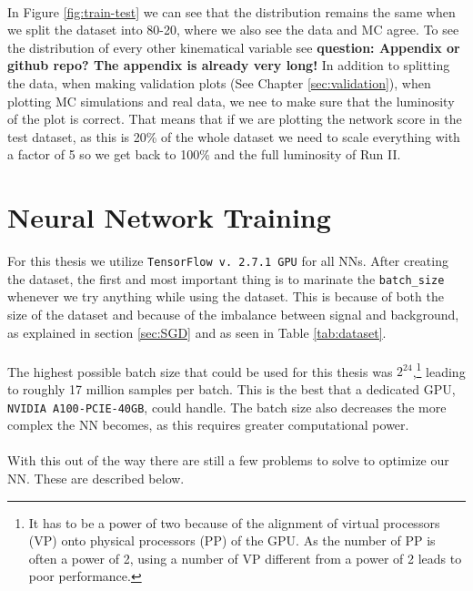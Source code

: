 \documentclass[12pt, a4paper]{book}
\begin{document}
\\In Figure \ref{fig:train-test} we can see that the distribution remains the same when we split the dataset into 80-20, where we also see the data and MC agree. To see the distribution of every other kinematical variable see \textbf{question: Appendix or github repo? The appendix is already very long!}
In addition to splitting the data, when making validation plots (See Chapter \ref{sec:validation}), when plotting MC simulations and real data, we nee to make sure that the luminosity of the plot is correct. That means that if we are plotting the network score in 
the test dataset, as this is 20\% of the whole dataset we need to scale everything with a factor of 5 so we get back to 100\% and the full luminosity of Run II.


\clearpage
\section{Neural Network Training}\label{chap:NN_train}
For this thesis we utilize \verb|TensorFlow v. 2.7.1 GPU| for all NNs. After creating the dataset, the first and most important thing is to marinate the \verb|batch_size| whenever we try anything while using the dataset. This is because of both the size of the dataset 
and because of the imbalance between signal and background, as explained in section \ref{sec:SGD} and as seen in Table \ref{tab:dataset}.\\
\\The highest possible batch size that could be used for this thesis was $2^{24}$,\footnote{It has to be a power of two because of the alignment of virtual processors (VP) onto physical processors (PP) of the GPU. As the number of PP is often a power of 2, using a number of VP different from a power of 2 leads to poor performance.} 
leading to roughly 17 million samples per batch. This is the best that a dedicated GPU, \verb|NVIDIA A100-PCIE-40GB|, could handle. The batch size also decreases the more complex the NN becomes, as this requires greater computational power.\\
\\With this out of the way there are still a few problems to solve to optimize our NN. These are described below.
\end{document}
